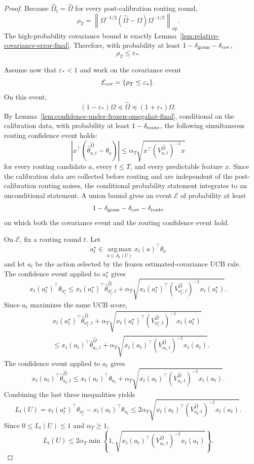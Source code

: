 \documentclass{article} %
\begin{document}
\begin{proof}
Because \(\widehat\Omega_t=\widehat\Omega\) for every post-calibration routing
round,
\[
\rho_T
=
\left\|
\Omega^{-1/2}(\widehat\Omega-\Omega)\Omega^{-1/2}
\right\|_{\mathrm{op}}.
\]
The high-probability covariance bound is exactly
Lemma~\ref{lem:relative-covariance-error-final}.  Therefore, with probability
at least \(1-\delta_{\rm gram}-\delta_{\rm cov}\),
\[
\rho_T\le\varepsilon_*.
\]

Assume now that \(\varepsilon_*<1\) and work on the covariance event
\[
\mathcal{E}_{\rm cov}=\{\rho_T\le\varepsilon_*\}.
\]
On this event,
\[
(1-\varepsilon_*)\Omega
\preceq
\widehat\Omega
\preceq
(1+\varepsilon_*)\Omega.
\]
By Lemma~\ref{lem:confidence-under-frozen-omegahat-final}, conditional on the
calibration data, with probability at least \(1-\delta_{\rm route}\), the
following simultaneous routing confidence event holds:
\[
\left|
x^\top(\widehat\theta_{a,t}^{\widehat\Omega}-\theta_a)
\right|
\le
\alpha_T
\sqrt{x^\top(V_{a,t}^{\widehat\Omega})^{-1}x}
\]
for every routing candidate \(a\), every \(t\le T\), and every predictable
feature \(x\).  Since the calibration data are collected before routing and are
independent of the post-calibration routing noises, the conditional probability
statement integrates to an unconditional statement.  A union bound gives an
event \(\mathcal{E}\) of probability at least
\[
1-\delta_{\rm gram}-\delta_{\rm cov}-\delta_{\rm route}
\]
on which both the covariance event and the routing confidence event hold.

On \(\mathcal{E}\), fix a routing round \(t\).  Let
\[
a_t^\star\in
\operatorname*{arg\,max}_{a\in A_t(U)}
x_t(a)^\top\theta_a
\]
and let \(a_t\) be the action selected by the frozen estimated-covariance UCB
rule.  The confidence event applied to \(a_t^\star\) gives
\[
x_t(a_t^\star)^\top\theta_{a_t^\star}
\le
x_t(a_t^\star)^\top\widehat\theta_{a_t^\star,t}^{\widehat\Omega}
+
\alpha_T
\sqrt{
x_t(a_t^\star)^\top
(V_{a_t^\star,t}^{\widehat\Omega})^{-1}
x_t(a_t^\star)
}.
\]
Since \(a_t\) maximizes the same UCB score,
\[
\begin{aligned}
&
x_t(a_t^\star)^\top\widehat\theta_{a_t^\star,t}^{\widehat\Omega}
+
\alpha_T
\sqrt{
x_t(a_t^\star)^\top
(V_{a_t^\star,t}^{\widehat\Omega})^{-1}
x_t(a_t^\star)
}
\\
&\le
x_t(a_t)^\top\widehat\theta_{a_t,t}^{\widehat\Omega}
+
\alpha_T
\sqrt{
x_t(a_t)^\top
(V_{a_t,t}^{\widehat\Omega})^{-1}
x_t(a_t)
}.
\end{aligned}
\]
The confidence event applied to \(a_t\) gives
\[
x_t(a_t)^\top\widehat\theta_{a_t,t}^{\widehat\Omega}
\le
x_t(a_t)^\top\theta_{a_t}
+
\alpha_T
\sqrt{
x_t(a_t)^\top
(V_{a_t,t}^{\widehat\Omega})^{-1}
x_t(a_t)
}.
\]
Combining the last three inequalities yields
\[
L_t(U)
=
x_t(a_t^\star)^\top\theta_{a_t^\star}
-
x_t(a_t)^\top\theta_{a_t}
\le
2\alpha_T
\sqrt{
x_t(a_t)^\top
(V_{a_t,t}^{\widehat\Omega})^{-1}
x_t(a_t)
}.
\]
Since \(0\le L_t(U)\le1\) and \(\alpha_T\ge1\),
\[
L_t(U)
\le
2\alpha_T
\min\!\left\{
1,
\sqrt{
x_t(a_t)^\top
(V_{a_t,t}^{\widehat\Omega})^{-1}
x_t(a_t)
}
\right\}.
\]


\end{proof}
\end{document}
